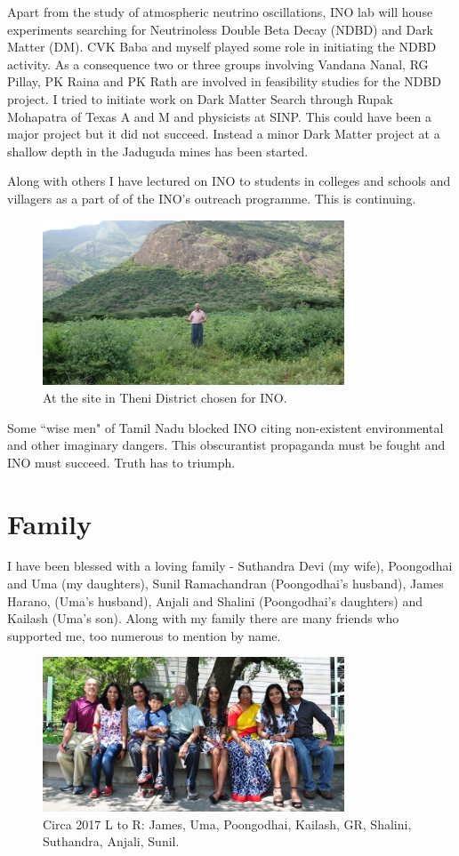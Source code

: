 \vskip 1pt
Apart from the study of atmospheric neutrino oscillations, INO lab will 
house experiments searching for Neutrinoless Double Beta Decay (NDBD) 
and Dark Matter (DM). CVK Baba and myself played some role in initiating 
the NDBD activity. As a consequence two or three groups involving 
Vandana Nanal, RG Pillay, PK Raina and PK Rath are involved in 
feasibility studies for the NDBD project. I tried to initiate work on 
Dark Matter Search through Rupak Mohapatra of Texas A and M and 
physicists at SINP. This could have been a major project but it did not 
succeed. Instead a minor Dark Matter project at a shallow depth in the 
Jaduguda mines has been started.


Along with others I have lectured on INO to students in colleges and 
schools and villagers as a part of of the INO's outreach programme. This 
is continuing.

\begin{figure}[h]
\centering
\includegraphics[width=0.8\textwidth]{images/Rajaji-ino.jpg}
\caption{\small{At the site in Theni District chosen for INO.}}
\end{figure}
  
Some ``wise men" of Tamil Nadu blocked INO citing non-exi\-stent 
environmental and other imaginary dangers. This obscurantist propaganda 
must be fought and INO must succeed. Truth has to triumph.

\section*{Family}

I have been blessed with a loving family - Suthandra Devi (my wife), 
Poongodhai and Uma (my daughters), Sunil Ramachandran (Poongodhai's 
husband), James Harano, (Uma's husband), Anjali and Shalini 
(Poongodhai's daughters) and Kailash (Uma's son).
Along with my family there are many friends who suppo\-rted me, too 
numerous to mention by name.


\begin{figure}[h]
\centering
\includegraphics[width=0.8\textwidth]{images/Rajaji-family-1.jpg}
\caption{\small{Circa 2017 L to R: James, Uma, Poongodhai, Kailash, GR, Shalini, Suthandra, Anjali, Sunil.}}
\end{figure}

